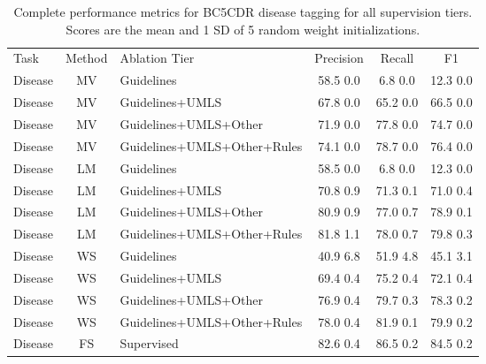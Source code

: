 \documentclass{article}
\begin{document}
\begin{table}[H]
\centering
\begin{tabular}{lclccc} \toprule
Task & Method & Ablation Tier & Precision & Recall & F1 \\
\cmidrule(lr){1-6}
Disease   &   MV   &   Guidelines   &   58.5 0.0   &   6.8 0.0   &   12.3 0.0  \\
Disease   &   MV   &   Guidelines+UMLS   &   67.8 0.0   &   65.2 0.0   &   66.5 0.0  \\
Disease   &   MV   &   Guidelines+UMLS+Other   &   71.9 0.0   &   77.8 0.0   &   74.7 0.0  \\
Disease   &   MV   &   Guidelines+UMLS+Other+Rules   &   74.1 0.0   &   78.7 0.0   &   76.4 0.0  \\
\cmidrule(lr){1-6}
Disease   &   LM   &   Guidelines   &   58.5 0.0   &   6.8 0.0   &   12.3 0.0  \\
Disease   &   LM   &   Guidelines+UMLS   &   70.8 0.9   &   71.3 0.1   &   71.0 0.4  \\
Disease   &   LM   &   Guidelines+UMLS+Other   &   80.9 0.9   &   77.0 0.7   &   78.9 0.1  \\
Disease   &   LM   &   Guidelines+UMLS+Other+Rules   &   81.8 1.1   &   78.0 0.7   &   79.8 0.3  \\
\cmidrule(lr){1-6}
Disease   &   WS   &   Guidelines   &   40.9 6.8   &   51.9 4.8   &   45.1 3.1  \\
Disease   &   WS   &   Guidelines+UMLS   &   69.4 0.4   &   75.2 0.4   &   72.1 0.4  \\
Disease   &   WS   &   Guidelines+UMLS+Other   &   76.9 0.4   &   79.7 0.3   &   78.3 0.2  \\
Disease   &   WS   &   Guidelines+UMLS+Other+Rules   &   78.0 0.4   &   81.9 0.1   &   79.9 0.2  \\
\cmidrule(lr){1-6}
Disease   &   FS   &   Supervised   &   82.6 0.4   &   86.5 0.2   &   84.5 0.2  \\
\bottomrule  
\end{tabular}
\caption{ \label{tbl:diseases} Complete performance metrics for BC5CDR disease tagging for all supervision tiers.
Scores are the mean and 1 SD of 5 random weight initializations.
}
\end{table}
\end{document}
